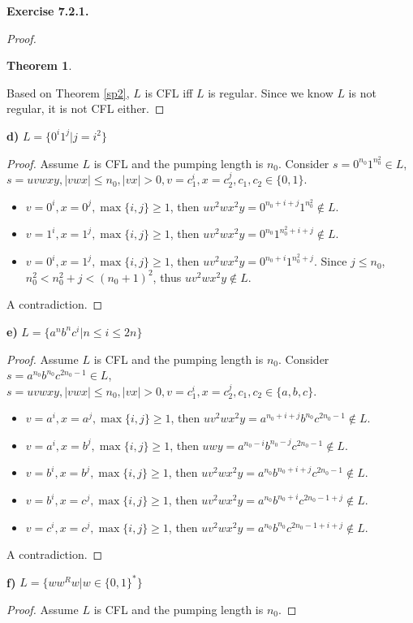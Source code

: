 \documentclass[a4paper]{article}
\newtheorem{theorem}{Theorem}
\newtheorem*{proof}{Proof}
\newenvironment{exercise}[1]{
	\par
	\noindent\textbf{Exercise #1.}\quad
}{
	\par
	\bigskip
}
\begin{document}
\begin{exercise}{7.2.1}
\begin{proof}
\begin{theorem}
        \end{theorem}
        Based on Theorem \ref{sp2}, $L$ is CFL iff $L$ is regular.
        Since we know $L$ is not regular, it is not CFL either.
    \end{proof}
\textbf{d)} $L=\{0^i1^j|j=i^2\}$
    \begin{proof}
        Assume $L$ is CFL and the pumping length is $n_0$.
        Consider $s=0^{n_0}1^{n_0^2}\in L$, $s=uvwxy,|vwx|\leqslant n_0,|vx|>0,v=c_1^i,x=c_2^j,c_1,c_2\in\{0,1\}$.
        \begin{itemize}
            \item $v=0^i,x=0^j,\max\{i,j\}\geqslant 1$, then $uv^2wx^2y=0^{n_0+i+j}1^{n_0^2}\notin L$.
            \item $v=1^i,x=1^j,\max\{i,j\}\geqslant 1$, then $uv^2wx^2y=0^{n_0}1^{n_0^2+i+j}\notin L$.
            \item $v=0^i,x=1^j,\max\{i,j\}\geqslant 1$, then $uv^2wx^2y=0^{n_0+i}1^{n_0^2+j}$.
                Since $j\leqslant n_0$, $n_0^2<n_0^2+j<(n_0+1)^2$, thus $uv^2wx^2y\notin L$.
        \end{itemize}
        A contradiction.
    \end{proof}
\textbf{e)} $L=\{a^nb^nc^i|n\leqslant i\leqslant 2n\}$
    \begin{proof}
        Assume $L$ is CFL and the pumping length is $n_0$.
        Consider $s=a^{n_0}b^{n_0}c^{2n_0-1}\in L$, $s=uvwxy,|vwx|\leqslant n_0,|vx|>0,v=c_1^i,x=c_2^j,c_1,c_2\in\{a,b,c\}$.
        \begin{itemize}
            \item $v=a^i,x=a^j,\max\{i,j\}\geqslant 1$, then $uv^2wx^2y=a^{n_0+i+j}b^{n_0}c^{2n_0-1}\notin L$.
            \item $v=a^i,x=b^j,\max\{i,j\}\geqslant 1$, then $uwy=a^{n_0-i}b^{n_0-j}c^{2n_0-1}\notin L$.
            \item $v=b^i,x=b^j,\max\{i,j\}\geqslant 1$, then $uv^2wx^2y=a^{n_0}b^{n_0+i+j}c^{2n_0-1}\notin L$.
            \item $v=b^i,x=c^j,\max\{i,j\}\geqslant 1$, then $uv^2wx^2y=a^{n_0}b^{n_0+i}c^{2n_0-1+j}\notin L$.
            \item $v=c^i,x=c^j,\max\{i,j\}\geqslant 1$, then $uv^2wx^2y=a^{n_0}b^{n_0}c^{2n_0-1+i+j}\notin L$.
        \end{itemize}
        A contradiction.
    \end{proof}
\textbf{f)} $L=\{ww^Rw|w\in\{0,1\}^*\}$
    \begin{proof}
        Assume $L$ is CFL and the pumping length is $n_0$.

\end{proof}
\end{exercise}
\end{document}

